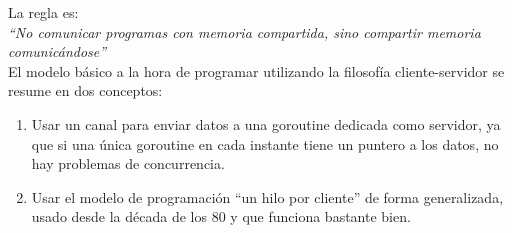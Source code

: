 La regla es:\\

\textit{``No comunicar programas con memoria compartida, sino compartir memoria
comunicándose''}\\

El modelo básico a la hora de programar utilizando la filosofía cliente-servidor
se resume en dos conceptos:

\begin{enumerate} \item Usar un canal para enviar datos a una goroutine dedicada
como servidor, ya que si una única goroutine en cada instante tiene un puntero
a los datos, no hay problemas de concurrencia.  \item Usar el modelo de
programación ``un hilo por cliente'' de forma generalizada, usado desde la
década de los 80 y que funciona bastante bien.  \end{enumerate}

\clearpage \thispagestyle{empty} \ \\ \newpage

